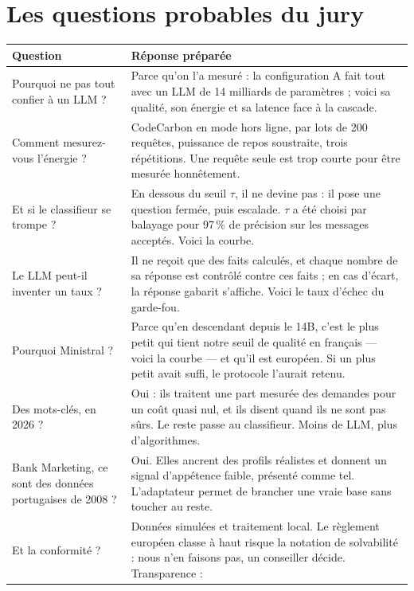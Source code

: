 \section{Les questions probables du jury}

\begin{center}\small
\begin{longtable}{@{}L{4.6cm} L{9.8cm}@{}}
\toprule
\textbf{Question} & \textbf{Réponse préparée} \\
\midrule
\endhead
Pourquoi ne pas tout confier à un LLM ? & Parce qu'on l'a mesuré : la configuration A fait tout
  avec un LLM de 14 milliards de paramètres ; voici sa qualité, son énergie et sa latence face à
  la cascade. \\
\addlinespace
Comment mesurez-vous l'énergie ? & CodeCarbon en mode hors ligne, par lots de 200 requêtes,
  puissance de repos soustraite, trois répétitions. Une requête seule est trop courte pour être
  mesurée honnêtement. \\
\addlinespace
Et si le classifieur se trompe ? & En dessous du seuil $\tau$, il ne devine pas : il pose une
  question fermée, puis escalade. $\tau$ a été choisi par balayage pour 97\,\% de précision sur
  les messages acceptés. Voici la courbe. \\
\addlinespace
Le LLM peut-il inventer un taux ? & Il ne reçoit que des faits calculés, et chaque nombre de sa
  réponse est contrôlé contre ces faits ; en cas d'écart, la réponse gabarit s'affiche. Voici le
  taux d'échec du garde-fou. \\
\addlinespace
Pourquoi Ministral ? & Parce qu'en descendant depuis le 14B, c'est le plus petit qui tient notre
  seuil de qualité en français --- voici la courbe --- et qu'il est européen. Si un plus petit
  avait suffi, le protocole l'aurait retenu. \\
\addlinespace
Des mots-clés, en 2026 ? & Oui : ils traitent une part mesurée des demandes pour un coût quasi nul,
  et ils disent quand ils ne sont pas sûrs. Le reste passe au classifieur. Moins de LLM, plus
  d'algorithmes. \\
\addlinespace
Bank Marketing, ce sont des données portugaises de 2008 ? & Oui. Elles ancrent des profils
  réalistes et donnent un signal d'appétence faible, présenté comme tel. L'adaptateur permet de
  brancher une vraie base sans toucher au reste. \\
\addlinespace
Et la conformité ? & Données simulées et traitement local. Le règlement européen classe à haut
  risque la notation de solvabilité : nous n'en faisons pas, un conseiller décide. Transparence :

\end{longtable}
\end{center}
